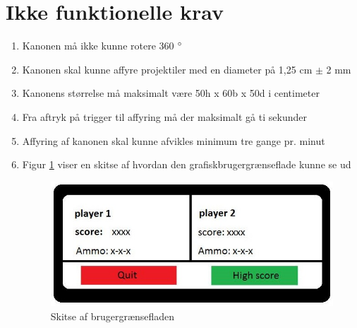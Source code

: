 \section{Ikke funktionelle krav}
\label{afsnit:ikkeFunkKrav}
\begin{enumerate}
	\item Kanonen må ikke kunne rotere 360 \(\degree\)
	\item Kanonen skal kunne affyre projektiler med en diameter på 1,25 cm \(\pm\) 2 mm
	\item Kanonens størrelse må maksimalt være 50h x 60b x 50d i centimeter
	\item Fra aftryk på trigger til affyring må der maksimalt gå ti sekunder
	\item Affyring af kanonen skal kunne afvikles minimum tre gange pr. minut
	\item Figur \ref{ref:brugergraesefladeskitse}  viser en skitse af hvordan den grafiskbrugergrænseflade kunne se ud
		\begin{figure}[H]
			\centering
			\includegraphics[width=\textwidth]{Kravspecifikation/images/brugergraensefladeskitse}
			\caption{Skitse af brugergrænsefladen}
			\label{ref:brugergraesefladeskitse}
		\end{figure}
\end{enumerate}
